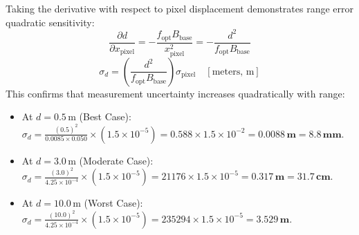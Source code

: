 \documentclass[11pt, a4paper]{article}
\begin{document}
Taking the derivative with respect to pixel displacement demonstrates range error quadratic sensitivity:
\begin{equation}
    \frac{\partial d}{\partial x_{\text{pixel}}} = -\frac{f_{\text{opt}} B_{\text{base}}}{x_{\text{pixel}}^2} = -\frac{d^2}{f_{\text{opt}} B_{\text{base}}}
\end{equation}
\begin{equation}
    \sigma_d = \left(\frac{d^2}{f_{\text{opt}} B_{\text{base}}}\right) \sigma_{\text{pixel}} \quad [\text{meters, m}]
\end{equation}
This confirms that measurement uncertainty increases quadratically with range:
\begin{itemize}
    \item At $d = 0.5\,\text{m}$ (Best Case): $\sigma_d = \frac{(0.5)^2}{0.0085 \times 0.050} \times (1.5\times 10^{-5}) = 0.588 \times 1.5\times 10^{-2} = \mathbf{0.0088\,\text{m}} = \mathbf{8.8\,\text{mm}}$.
    \item At $d = 3.0\,\text{m}$ (Moderate Case): $\sigma_d = \frac{(3.0)^2}{4.25\times 10^{-4}} \times (1.5\times 10^{-5}) = 21176 \times 1.5\times 10^{-5} = \mathbf{0.317\,\text{m}} = \mathbf{31.7\,\text{cm}}$.
    \item At $d = 10.0\,\text{m}$ (Worst Case): $\sigma_d = \frac{(10.0)^2}{4.25\times 10^{-4}} \times (1.5\times 10^{-5}) = 235294 \times 1.5\times 10^{-5} = \mathbf{3.529\,\text{m}}$.
\end{itemize}
\end{document}
